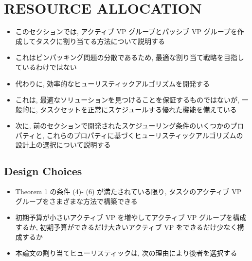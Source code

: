 
\section{RESOURCE ALLOCATION}
\label{sec: resource allocation}

\begin{frame}{}
    \begin{itemize}
        \item このセクションでは, アクティブ VP グループとパッシブ VP グループを作成してタスクに割り当てる方法について説明する
\item これはビンパッキング問題の分散であるため, 最適な割り当て戦略を目指しているわけではない
\item 代わりに, 効率的なヒューリスティックアルゴリズムを開発する
\item これは, 最適なソリューションを見つけることを保証するものではないが, 一般的に, タスクセットを正常にスケジュールする優れた機能を備えている
\item 次に, 前のセクションで開発されたスケジューリング条件のいくつかのプロパティと, これらのプロパティに基づくヒューリスティックアルゴリズムの設計上の選択について説明する
    \end{itemize}
\end{frame}

\subsection{Design Choices}
\label{ssec: design choices}

\begin{frame}{}
    \begin{itemize}
        \item Theorem 1 の条件 (4)- (6) が満たされている限り, タスクのアクティブ VP グループをさまざまな方法で構築できる
\item 初期予算が小さいアクティブ VP を増やしてアクティブ VP グループを構成するか, 初期予算ができるだけ大きいアクティブ VP をできるだけ少なく構成するか
\item 本論文の割り当てヒューリスティックは, 次の理由により後者を選択する
    \end{itemize}
\end{frame}

